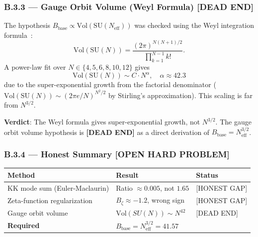\documentclass[11pt,a4paper]{article}
\theoremstyle{remark}
\begin{document}
\subsubsection*{B.3.3 — Gauge Orbit Volume (Weyl Formula)  \textbf{[DEAD END]}}
\label{sec:B3-gauge-volume}

The hypothesis $B_{\mathrm{base}} \propto \mathrm{Vol}(\mathrm{SU}(N_{\mathrm{eff}}))$
was checked using the Weyl integration formula~\cite{Brocker1985}:
\begin{equation}
\mathrm{Vol}(\mathrm{SU}(N)) = \frac{(2\pi)^{N(N+1)/2}}{\prod_{k=1}^{N-1} k!}.
\label{eq:Vol-SUN}
\end{equation}
A power-law fit over $N \in \{4, 5, 6, 8, 10, 12\}$ gives
\begin{equation}
\mathrm{Vol}(\mathrm{SU}(N)) \sim C \cdot N^\alpha, \quad \alpha \approx 42.3
\label{eq:Vol-power-law}
\end{equation}
due to the super-exponential growth from the factorial denominator
($\mathrm{Vol}(\mathrm{SU}(N)) \sim (2\pi e/N)^{N^2/2}$ by Stirling's approximation).
This scaling is far from $N^{3/2}$.

\textbf{Verdict}: The Weyl formula gives super-exponential growth, not $N^{3/2}$.
The gauge orbit volume hypothesis is \textbf{[DEAD END]} as a direct derivation
of $B_{\mathrm{base}} = N_{\mathrm{eff}}^{3/2}$.

\subsubsection*{B.3.4 — Honest Summary  \textbf{[OPEN HARD PROBLEM]}}
\label{sec:B3-summary}

\begin{center}
\begin{tabular}{lll}
\hline
\textbf{Method} & \textbf{Result} & \textbf{Status} \\
\hline
KK mode sum (Euler-Maclaurin) & Ratio $\approx 0.005$, not $1.65$ & [HONEST GAP] \\
Zeta-function regularization  & $B_\zeta \approx -1.2$, wrong sign & [HONEST GAP] \\
Gauge orbit volume             & $\mathrm{Vol}(SU(N)) \sim N^{42}$  & [DEAD END] \\
\hline
\textbf{Required} & $B_{\mathrm{base}} = N_{\mathrm{eff}}^{3/2} = 41.57$ & \\
\hline
\end{tabular}
\end{center}
\end{document}
